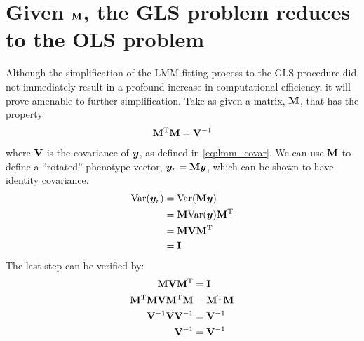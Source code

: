 


\section{Given \texorpdfstring{$\mathbf{M}$}{M}, the GLS problem reduces to the OLS problem}
\label{sec:givenM}

Although the simplification of the LMM fitting process to the GLS procedure did not immediately result in a profound increase in computational efficiency, it will prove amenable to further simplification.
Take as given a matrix, $\mathbf{M}$, that has the property
\begin{align}
	\mathbf{M} ^\mathrm{T} \mathbf{M} = \mathbf{V} ^{-1}
\end{align}
where $\mathbf{V}$ is the covariance of $\bm{y}$, as defined in \cref{eq:lmm_covar}.
We can use $\mathbf{M}$ to define a ``rotated'' phenotype vector, $\bm{y}_r = \mathbf{M} \bm{y}$, which can be shown to have identity covariance.
\begin{align}
\text{Var}(\bm{y}_r) &= \text{Var}(\mathbf{M} \bm{y}) \\
            &= \mathbf{M} \text{Var}(\bm{y}) \mathbf{M} ^\mathrm{T}\\
            &= \mathbf{M} \mathbf{V} \mathbf{M} ^\mathrm{T} \\
            &= \mathbf{I}
\end{align}
The last step can be verified by:
\begin{align}
  \mathbf{M} \mathbf{V} \mathbf{M} ^\mathrm{T}            &= \mathbf{I}\\
  \mathbf{M} ^\mathrm{T} \mathbf{M} \mathbf{V} \mathbf{M} ^\mathrm{T} \mathbf{M} &= \mathbf{M} ^\mathrm{T} \mathbf{M} \\
  \mathbf{V} ^{-1} \mathbf{V} \mathbf{V} ^{-1}     &= \mathbf{V} ^{-1}\\
  \mathbf{V} ^{-1}                  &= \mathbf{V} ^{-1}
\end{align}

